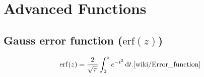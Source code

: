 \chapter{Advanced Functions}


\section{Gauss error function ($\text{erf}(z)$)}

\[
    {\displaystyle \operatorname {erf} (z)={\dfrac {2}{\sqrt {\pi }}}\int _{0}^{z}e^{-t^{2}}\,\mathrm {d} t.}
    \hfill \text{\cite{wiki/Error_function}}
\]






